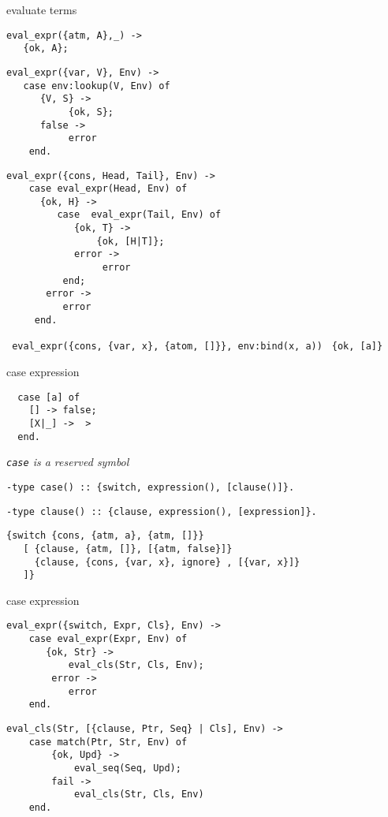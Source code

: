 \begin{frame}[fragile]{evaluate terms}

\begin{verbatim}
eval_expr({atm, A},_) ->
   {ok, A};
\end{verbatim}
\pause
\begin{verbatim}
eval_expr({var, V}, Env) ->
   case env:lookup(V, Env) of
      {V, S} ->
           {ok, S};
      false ->
           error
    end.
\end{verbatim}
\pause
\begin{verbatim}
eval_expr({cons, Head, Tail}, Env) ->
    case eval_expr(Head, Env) of
      {ok, H} ->
         case  eval_expr(Tail, Env) of
            {ok, T} ->
                {ok, [H|T]};
            error ->
                 error
          end;
       error ->
          error
     end.
\end{verbatim}
\pause\vspace{20pt}
\verb+ eval_expr({cons, {var, x}, {atom, []}}, env:bind(x, a))+
\pause\vspace{10pt}
\verb+ {ok, [a]}+
\end{frame}


\begin{frame}[fragile]{case expression}

\begin{verbatim}
  case [a] of
    [] -> false;
    [X|_] ->  >
  end.
\end{verbatim}

{\em \verb+case+ is a reserved symbol}
\pause

\begin{verbatim}
-type case() :: {switch, expression(), [clause()]}.
\end{verbatim}
\pause
\begin{verbatim}
-type clause() :: {clause, expression(), [expression]}.
\end{verbatim}

\pause
\begin{verbatim}
{switch {cons, {atm, a}, {atm, []}}  
   [ {clause, {atm, []}, [{atm, false}]}
     {clause, {cons, {var, x}, ignore} , [{var, x}]}
   ]}
\end{verbatim}

\end{frame}

\begin{frame}[fragile]{case expression}

\begin{verbatim}
eval_expr({switch, Expr, Cls}, Env) ->
    case eval_expr(Expr, Env) of
       {ok, Str} ->
           eval_cls(Str, Cls, Env);
        error ->
           error
    end.
\end{verbatim}

\pause
\begin{verbatim}
eval_cls(Str, [{clause, Ptr, Seq} | Cls], Env) ->
    case match(Ptr, Str, Env) of
        {ok, Upd} ->
            eval_seq(Seq, Upd);
        fail ->
            eval_cls(Str, Cls, Env)
    end.
\end{verbatim}

\end{frame}


